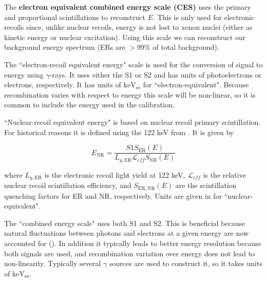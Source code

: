 The \textbf{electron equivalent combined energy scale (CES)} uses the primary and proportional scintillations to reconstruct $E$.  This is
only used for electronic recoils since, unlike nuclear recoils, energy is not lost to xenon nuclei (either as kinetic energy or nuclear
excitation).  Using this scale we can reconstruct our background energy spectrum (ERs are $> 99\%$ of total background).

The ``electron-recoil equivalent energy" scale is used for the conversion of signal to energy using $\gamma$-rays.  It uses either the S1 or
S2 and has units of photoelectrons or electrons, respectively.  It has units of $\mathrm{keV_{ee}}$ for ``electron-equivalent".  Because
recombination varies with respect to energy this scale will be non-linear, so it is common to include the energy used in the
calibration.

``Nuclear-recoil equivalent energy" is based on nuclear recoil primary scintillation.  For historical reasons it is defined using the
122 keV \gammaray from .  It is given by

\begin{equation}
E_{\mathrm{NR}} = \frac{S1 S_{\mathrm{ER}}(E)}{L_{y,\mathrm{ER}} \mathcal{L}_{eff} S_{\mathrm{NR}}(E)}
\end{equation}

\noindent where $L_{y,\mathrm{ER}}$ is the electronic recoil light yield at 122 keV, $\mathcal{L}_{eff}$ is the relative nuclear
recoil
scintillation efficiency, and $S_{\mathrm{ER,NR}}(E)$ are the scintillation quenching factors for ER and NR, respectively.  Units are
given in \kevnr for ``nuclear-equivalent".

The ``combined energy scale" uses both S1 and S2.  This is beneficial because natural fluctuations between photons and electrons at a
given energy are now accounted for ().  In addition it typically leads to better energy resolution because both signals
are used, and recombination variation over energy does not lead to non-linearity.  Typically several $\gamma$ sources are used to
construct it, so it takes units of $\mathrm{keV_{ee}}$.






















